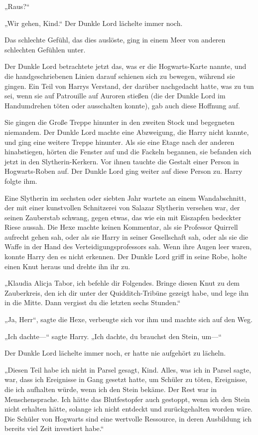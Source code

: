 {„Raus?“

„Wir gehen, Kind.“ Der Dunkle Lord lächelte immer noch.

Das schlechte Gefühl, das dies auslöste, ging in einem Meer von anderen schlechten Gefühlen unter.

Der Dunkle Lord betrachtete jetzt das, was er die Hogwarts-Karte nannte, und die handgeschriebenen Linien darauf schienen sich zu bewegen, während sie gingen. Ein Teil von Harrys Verstand, der darüber nachgedacht hatte, was zu tun sei, wenn sie auf Patrouille auf Auroren stießen (die der Dunkle Lord im Handumdrehen töten oder ausschalten konnte), gab auch diese Hoffnung auf.

Sie gingen die Große Treppe hinunter in den zweiten Stock und begegneten niemandem. Der Dunkle Lord machte eine Abzweigung, die Harry nicht kannte, und ging eine weitere Treppe hinunter. Als sie eine Etage nach der anderen hinabstiegen, hörten die Fenster auf und die Fackeln begannen, sie befanden sich jetzt in den Slytherin-Kerkern. Vor ihnen tauchte die Gestalt einer Person in Hogwarts-Roben auf. Der Dunkle Lord ging weiter auf diese Person zu. Harry folgte ihm.

Eine Slytherin im sechsten oder siebten Jahr wartete an einem Wandabschnitt, der mit einer kunstvollen Schnitzerei von Salazar Slytherin versehen war, der seinen Zauberstab schwang, gegen etwas, das wie ein mit Eiszapfen bedeckter Riese aussah. Die Hexe machte keinen Kommentar, als sie Professor Quirrell aufrecht gehen sah, oder als sie Harry in seiner Gesellschaft sah, oder als sie die Waffe in der Hand des Verteidigungsprofessors sah. Wenn ihre Augen leer waren, konnte Harry den es nicht erkennen. Der Dunkle Lord griff in seine Robe, holte einen Knut heraus und drehte ihn ihr zu.

„Klaudia Alicja Tabor, ich befehle dir Folgendes. Bringe diesen Knut zu dem Zauberkreis, den ich dir unter der Quidditch-Tribüne gezeigt habe, und lege ihn in die Mitte. Dann vergisst du die letzten sechs Stunden.“

„Ja, Herr“, sagte die Hexe, verbeugte sich vor ihm und machte sich auf den Weg.

„Ich dachte—“ sagte Harry. „Ich dachte, du brauchst den Stein, um—“

Der Dunkle Lord lächelte immer noch, er hatte nie aufgehört zu lächeln.

„Diesen Teil habe ich nicht in Parsel gesagt, Kind. Alles, was ich in Parsel sagte, war, dass ich Ereignisse in Gang gesetzt hatte, um Schüler zu töten, Ereignisse, die ich aufhalten würde, wenn ich den Stein bekäme. Der Rest war in Menschensprache. Ich hätte das Blutfestopfer auch gestoppt, wenn ich den Stein nicht erhalten hätte, solange ich nicht entdeckt und zurückgehalten worden wäre. Die Schüler von Hogwarts sind eine wertvolle Ressource, in deren Ausbildung ich bereits viel Zeit investiert habe.“

}
